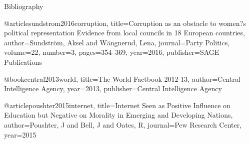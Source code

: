 Bibliography

@article{sundstrom2016corruption,
  title={Corruption as an obstacle to women?s political representation Evidence from local councils in 18 European countries},
  author={Sundstr{\"o}m, Aksel and W{\"a}ngnerud, Lena},
  journal={Party Politics},
  volume={22},
  number={3},
  pages={354--369},
  year={2016},
  publisher={SAGE Publications}
}

@book{central2013world,
  title={The World Factbook 2012-13},
  author={Central Intelligence Agency},
  year={2013},
  publisher={Central Intelligence Agency}
}


@article{poushter2015internet,
  title={Internet Seen as Positive Influence on Education but Negative on Morality in Emerging and Developing Nations},
  author={Poushter, J and Bell, J and Oates, R},
  journal={Pew Research Center},
  year={2015}
}